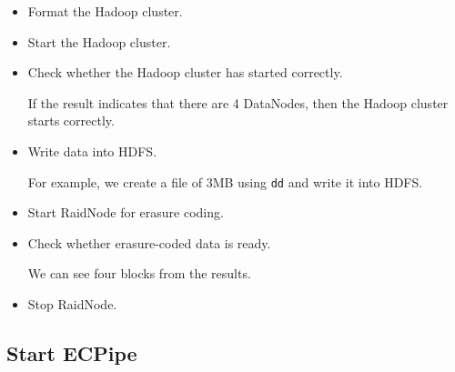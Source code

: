 \documentclass[letterpaper,12pt]{article}
\begin{document}
\begin{itemize}

\item Format the Hadoop cluster.

\noindent{}

\item Start the Hadoop cluster.

\noindent{}

\item Check whether the Hadoop cluster has started correctly.

\noindent{}

If the result indicates that there are 4 DataNodes, then the Hadoop cluster
starts correctly.

\item Write data into HDFS.

For example, we create a file of 3MB using {\tt dd} and write it into HDFS.

\noindent{}

\item Start RaidNode for erasure coding.

\noindent{}

\item Check whether erasure-coded data is ready.

\noindent{}

We can see four blocks from the results.

\item Stop RaidNode.

\noindent{}
\end{itemize}

\subsection{Start ECPipe}
\end{document}
